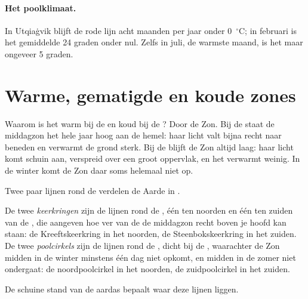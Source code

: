 \paragraph{Het poolklimaat.} In Utqiaġvik blijft de rode lijn acht maanden
per jaar onder 0~$^\circ$C; in februari is het gemiddelde 24 graden onder
nul. Zelfs in juli, de warmste maand, is het maar ongeveer 5 graden.

\section{Warme, gematigde en koude zones}

Waarom is het warm bij de  en koud bij de ? Door de Zon. Bij de
 staat de middagzon het hele jaar hoog aan de hemel: haar licht
valt bijna recht naar beneden en verwarmt de grond sterk. Bij de 
blijft de Zon altijd laag: haar licht komt schuin aan, verspreid over een
groot oppervlak, en het verwarmt weinig. In de winter komt de Zon daar
soms helemaal niet op.

Twee paar lijnen rond de  verdelen de Aarde in .

\begin{definition}\label{def:g5:weather-and-climate:tropics}
De twee \emph{keerkringen} zijn de lijnen rond de ,
één ten noorden en één ten zuiden van de , die aangeven hoe ver van
de  de middagzon recht boven je hoofd kan staan: de Kreeftskeerkring
in het noorden, de Steenbokskeerkring in het zuiden. De twee
\emph{poolcirkels} zijn de lijnen rond de , dicht
bij de , waarachter de Zon midden in de winter minstens één dag niet
opkomt, en midden in de zomer niet ondergaat: de noordpoolcirkel in het
noorden, de zuidpoolcirkel in het zuiden.
\end{definition}

De schuine stand van de aardas bepaalt waar deze lijnen liggen.

